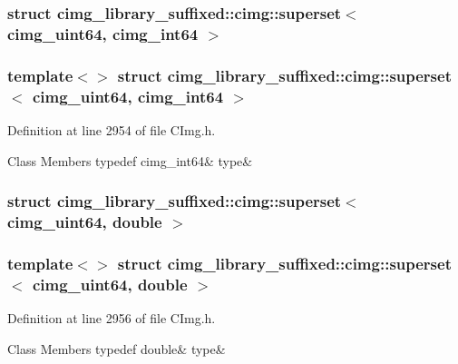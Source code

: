 \subsubsection{struct cimg\+\_\+library\+\_\+suffixed\+:\+:cimg\+:\+:superset$<$ cimg\+\_\+uint64, cimg\+\_\+int64 $>$}
\subsubsection*{template$<$$>$\newline
struct cimg\+\_\+library\+\_\+suffixed\+::cimg\+::superset$<$ cimg\+\_\+uint64, cimg\+\_\+int64 $>$}



Definition at line 2954 of file C\+Img.\+h.

\begin{DoxyFields}{Class Members}
\mbox{\label{namespacecimg__library__suffixed_1_1cimg_a871e5b305680fb0454dc461f72fe1ee2}} 
typedef cimg\_int64&
type&
\\
\hline

\end{DoxyFields}
\label{structcimg__library__suffixed_1_1cimg_1_1superset_3_01cimg__uint64_00_01double_01_4}
\subsubsection{struct cimg\+\_\+library\+\_\+suffixed\+:\+:cimg\+:\+:superset$<$ cimg\+\_\+uint64, double $>$}
\subsubsection*{template$<$$>$\newline
struct cimg\+\_\+library\+\_\+suffixed\+::cimg\+::superset$<$ cimg\+\_\+uint64, double $>$}



Definition at line 2956 of file C\+Img.\+h.

\begin{DoxyFields}{Class Members}
\mbox{\label{namespacecimg__library__suffixed_1_1cimg_a5246bf86686536651e52a4832bb4da92}} 
typedef double&
type&
\\
\hline

\end{DoxyFields}
\label{structcimg__library__suffixed_1_1cimg_1_1superset_3_01cimg__uint64_00_01float_01_4}
